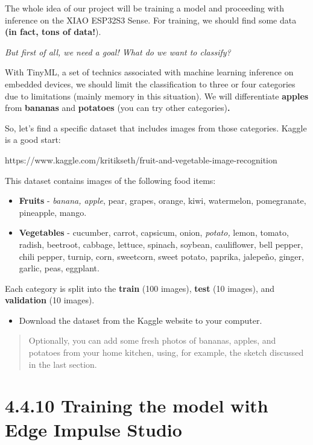 \documentclass[
  letterpaper,
  DIV=11,
  numbers=noendperiod]{scrreprt}
\providecommand{\tightlist}{%
  \setlength{\itemsep}{0pt}\setlength{\parskip}{0pt}}\usepackage{longtable,booktabs,array}
\begin{document}
The whole idea of our project will be training a model and proceeding
with inference on the XIAO ESP32S3 Sense. For training, we should find
some data \textbf{(in fact, tons of data!}).

\emph{But first of all, we need a goal! What do we want to classify?}

With TinyML, a set of technics associated with machine learning
inference on embedded devices, we should limit the classification to
three or four categories due to limitations (mainly memory in this
situation). We will differentiate \textbf{apples} from \textbf{bananas}
and \textbf{potatoes} (you can try other categories)\textbf{.}

So, let's find a specific dataset that includes images from those
categories. Kaggle is a good start:

https://www.kaggle.com/kritikseth/fruit-and-vegetable-image-recognition

This dataset contains images of the following food items:

\begin{itemize}
\tightlist
\item
  \textbf{Fruits} - \emph{banana, apple}, pear, grapes, orange, kiwi,
  watermelon, pomegranate, pineapple, mango.
\item
  \textbf{Vegetables} - cucumber, carrot, capsicum, onion,
  \emph{potato,} lemon, tomato, radish, beetroot, cabbage, lettuce,
  spinach, soybean, cauliflower, bell pepper, chili pepper, turnip,
  corn, sweetcorn, sweet potato, paprika, jalepeño, ginger, garlic,
  peas, eggplant.
\end{itemize}

Each category is split into the \textbf{train} (100 images),
\textbf{test} (10 images), and \textbf{validation} (10 images).

\begin{itemize}
\tightlist
\item
  Download the dataset from the Kaggle website to your computer.
\end{itemize}

\begin{quote}
Optionally, you can add some fresh photos of bananas, apples, and
potatoes from your home kitchen, using, for example, the sketch
discussed in the last section.
\end{quote}

\hypertarget{training-the-model-with-edge-impulse-studio}{%
\section*{4.4.10 Training the model with Edge Impulse
Studio}\label{training-the-model-with-edge-impulse-studio}}
\end{document}
